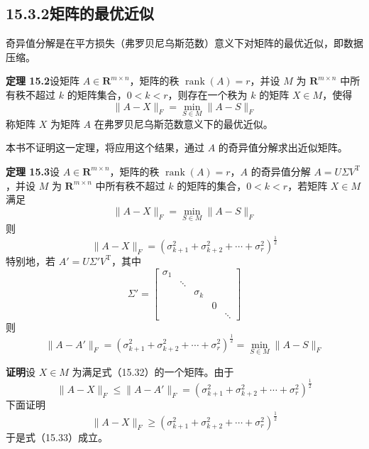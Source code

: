\documentclass[UTF8,12pt,a4paper,fontset=fandol]{ctexart}
\begin{document}
\subsection*{15.3.2\quad 矩阵的最优近似}

奇异值分解是在平方损失（弗罗贝尼乌斯范数）意义下对矩阵的最优近似，即数据压缩。

\noindent\textbf{定理 15.2}\quad 设矩阵 $A\in\mathbf{R}^{m\times n}$，矩阵的秩 $\operatorname{rank}(A)=r$，并设 $M$ 为 $\mathbf{R}^{m\times n}$ 中所有秩不超过 $k$ 的矩阵集合，$0<k<r$，则存在一个秩为 $k$ 的矩阵 $X\in M$，使得
\begin{equation}
\|A-X\|_F=\min_{S\in M}\|A-S\|_F
\tag{15.31}
\end{equation}
称矩阵 $X$ 为矩阵 $A$ 在弗罗贝尼乌斯范数意义下的最优近似。

本书不证明这一定理，将应用这个结果，通过 $A$ 的奇异值分解求出近似矩阵。

\noindent\textbf{定理 15.3}\quad 设 $A\in\mathbf{R}^{m\times n}$，矩阵的秩 $\operatorname{rank}(A)=r$，$A$ 的奇异值分解 $A=U\Sigma V^{\mathrm{T}}$，并设 $M$ 为 $\mathbf{R}^{m\times n}$ 中所有秩不超过 $k$ 的矩阵的集合，$0<k<r$，若矩阵 $X\in M$ 满足
\begin{equation}
\|A-X\|_F=\min_{S\in M}\|A-S\|_F
\tag{15.32}
\end{equation}
则
\begin{equation}
\|A-X\|_F=(\sigma_{k+1}^2+\sigma_{k+2}^2+\cdots+\sigma_r^2)^{\frac12}
\tag{15.33}
\end{equation}
特别地，若 $A'=U\Sigma'V^{\mathrm{T}}$，其中
\[
\Sigma'=
\begin{bmatrix}
\sigma_1&&&&\\
&\ddots&&&\\
&&\sigma_k&&\\
&&&0&\\
&&&&\ddots
\end{bmatrix}
\]
则
\begin{equation}
\|A-A'\|_F=(\sigma_{k+1}^2+\sigma_{k+2}^2+\cdots+\sigma_r^2)^{\frac12}
=\min_{S\in M}\|A-S\|_F
\tag{15.34}
\end{equation}

\noindent\textbf{证明}\quad 设 $X\in M$ 为满足式（15.32）的一个矩阵。由于
\begin{equation}
\|A-X\|_F\leqslant\|A-A'\|_F
=(\sigma_{k+1}^2+\sigma_{k+2}^2+\cdots+\sigma_r^2)^{\frac12}
\tag{15.35}
\end{equation}
下面证明
\[
\|A-X\|_F\geqslant(\sigma_{k+1}^2+\sigma_{k+2}^2+\cdots+\sigma_r^2)^{\frac12}
\]
于是式（15.33）成立。
\end{document}
